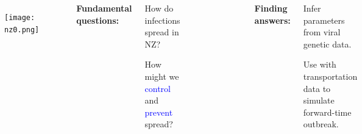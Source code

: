 \documentclass{beamer}
\begin{document}
\begin{frame}

\begin{columns}[c] %


\begin{figure}
\texttt{[image: nz0.png]}
\end{figure}

\vspace{3mm}
\footnotesize{\bf{Fundamental questions:}}
\begin{itemize}
\scriptsize{
\item How do infections spread in NZ?
\item How might we \textcolor{blue}{control} and \textcolor{blue}{prevent} spread?}
\end{itemize}


\begin{figure}
\includegraphics[width=0.75\linewidth]{map.png}
\end{figure}

\footnotesize{\bf{Finding answers:}}
\begin{itemize}
\scriptsize{
\item Infer parameters from viral genetic data.
\item Use with transportation data to simulate forward-time outbreak.}
\end{itemize}
\vspace{3mm}
\end{columns}

\end{frame}
\end{document}
